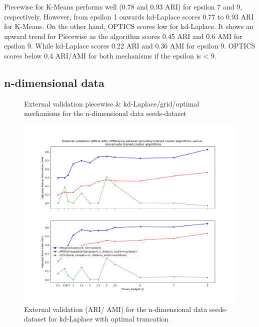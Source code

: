 Piecewise for K-Means performs well (0.78 and 0.93 ARI) for epsilon 7 and 9, respectively.
However, from epsilon 1 onwards kd-Laplace scores 0.77 to 0.93 ARI for K-Means.
On the other hand, OPTICS scores low for kd-Laplace.
It shows an upward trend for Piecewise as the algorithm scores 0.45 ARI and 0.6 AMI for epsilon 9.
While kd-Laplace scores 0.22 ARI and 0.36 AMI for epsilon 9.
OPTICS scores below 0.4 ARI/AMI for both mechanisms if the epsilon is < 9.

\subsection{n-dimensional data}
\begin{figure}[H]
    \caption{External validation piecewise \& kd-Laplace/grid/optimal mechanisms for the n-dimensional data seeds-dataset}
    \centering
    \begin{minipage}[c]{0.60\textwidth}
        \includegraphics[width=1\textwidth]{Results/nd-laplace-optimal-truncated/seeds-dataset/ami-and-ari.png}
        \caption{External validation (ARI/ AMI) for the n-dimensional data seeds-dataset for kd-Laplace with optimal truncation}
        \label{fig:external-validation-seeds-dataset_comparison_nd-laplace}
    \end{minipage}
    \begin{minipage}[c]{0.60\textwidth}

\end{minipage}
\end{figure}
